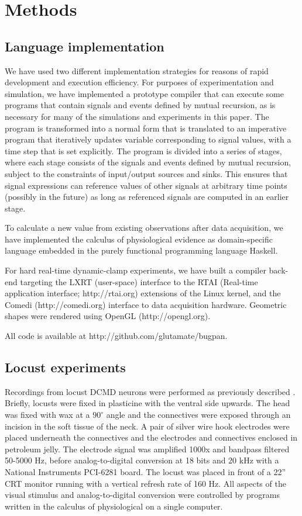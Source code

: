\section*{Methods}

\subsection*{Language implementation} 

We have used two different implementation strategies for reasons of
rapid development and execution efficiency. For purposes of
experimentation and simulation, we have implemented a prototype
compiler that can execute some programs that contain signals and
events defined by mutual recursion, as is necessary for many of the
simulations and experiments in this paper. The program is transformed
into a normal form that is translated to an imperative
program that iteratively updates variable corresponding to signal
values, with a time step that is set explicitly. The program is divided
into a series of stages, where each stage consists of the signals and
events defined by mutual recursion, subject to the constraints of
input/output sources and sinks. This ensures that signal expressions
can reference values of other signals at arbitrary time points
(possibly in the future) as long as referenced signals are computed in
an earlier stage.

To calculate a new value from existing observations after data
acquisition, we have implemented the calculus of physiological
evidence as domain-specific language embedded in the purely functional
programming language Haskell. 

For hard real-time dynamic-clamp experiments, we have built a compiler
back-end targeting the LXRT (user-space) interface to the RTAI (Real-time
application interface; http://rtai.org) extensions of the Linux
kernel, and the Comedi (http://comedi.org) interface to data
acquisition hardware. Geometric shapes were rendered using OpenGL
(http://opengl.org).

All code is available at http://github.com/glutamate/bugpan.

\subsection*{Locust experiments}

Recordings from locust DCMD neurons were performed as previously
described \citep{Matheson2004}. Briefly, locusts were fixed in
plasticine with the ventral side upwards. The head was fixed with wax
at a $90^{\circ}$ angle and the connectives were exposed through an
incision in the soft tissue of the neck. A pair of silver wire hook
electrodes were placed underneath the connectives and the electrodes
and connectives enclosed in petroleum jelly. The electrode signal was
amplified 1000x and bandpass filtered 50-5000 Hz, before
analog-to-digital conversion at 18 bits and 20 kHz with a National
Instruments PCI-6281 board. The locust was placed in front of a 22''
CRT monitor running with a vertical refresh rate of 160 Hz. All
aspects of the visual stimulus and analog-to-digital conversion were
controlled by programs written in the calculus of physiological on a
single computer.

